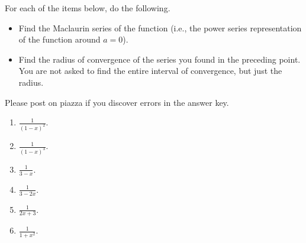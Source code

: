 For each of the items below, do the following.
\begin{itemize}
\item Find the Maclaurin series of the function (i.e., the power series representation of the function around $a=0$).
\item Find the radius of convergence of the series you found in the preceding point. You are not asked to find the entire interval of convergence, but just the radius.
\end{itemize}
Please post on piazza if you discover errors in the answer key.
\begin{multicols}{2}
\begin{enumerate}[ref={\fcProblemRef}]
\item $\displaystyle \frac{1}{(1-x)^2}$.

\item $\displaystyle \frac{1}{(1-x)^3}$.


\item $\displaystyle \frac{1}{3-x}$.

\item $\displaystyle \frac{1}{3-2x}$.

\item $\displaystyle \frac{1}{2x+3}$.

\item $\displaystyle \frac{1}{1+x^2}$.


\end{enumerate}
\end{multicols}
